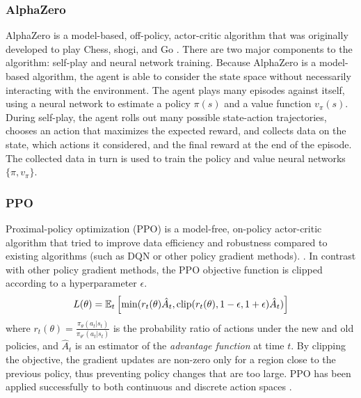 \subsubsection{AlphaZero}


AlphaZero is a model-based, off-policy, actor-critic algorithm that was originally developed to play Chess, shogi, and Go \cite{Silver1140}. There are two major components to the algorithm: self-play and neural network training. Because AlphaZero is a model-based algorithm, the agent is able to consider the state space without necessarily interacting with the environment. The agent plays many episodes against itself, using a neural network to estimate a policy $\pi(s)$ and a value function $v_\pi(s)$. During self-play, the agent rolls out many possible state-action trajectories, chooses an action that maximizes the expected reward, and collects data on the state, which actions it considered, and the final reward at the end of the episode. The collected data in turn is used to train the policy and value neural networks $\{ \pi, v_\pi \}$.


\subsubsection{PPO}

Proximal-policy optimization (PPO) is a model-free, on-policy actor-critic algorithm that tried to improve data efficiency and robustness compared to existing algorithms (such as DQN or other policy gradient methods).
\cite{schulman2017proximal}.
In contrast with other policy gradient methods, the PPO objective function is clipped according to a hyperparameter $\epsilon$.
\begin{equation}\label{eq:ppo_loss}
    L(\theta) = \mathbb E_t \left[\min(
        r_t(\theta)\hat{A}_t,
        \text{clip}(r_t(\theta), 1-\epsilon, 1+\epsilon) \hat{A}_t
    )\right]
\end{equation}
where
$r_t(\theta) = \frac{\pi_\theta(a_t|s_t)}{\pi_{\theta'}(a_t|s_t)}$ is the probability ratio of actions under the new and old policies, and $\hat{A}_t$ is an estimator of the \emph{advantage function} at time $t$. By clipping the objective, the gradient updates are non-zero only for a region close to the previous policy, thus preventing policy changes that are too large.
PPO has been applied successfully to both continuous and discrete action spaces%
.

